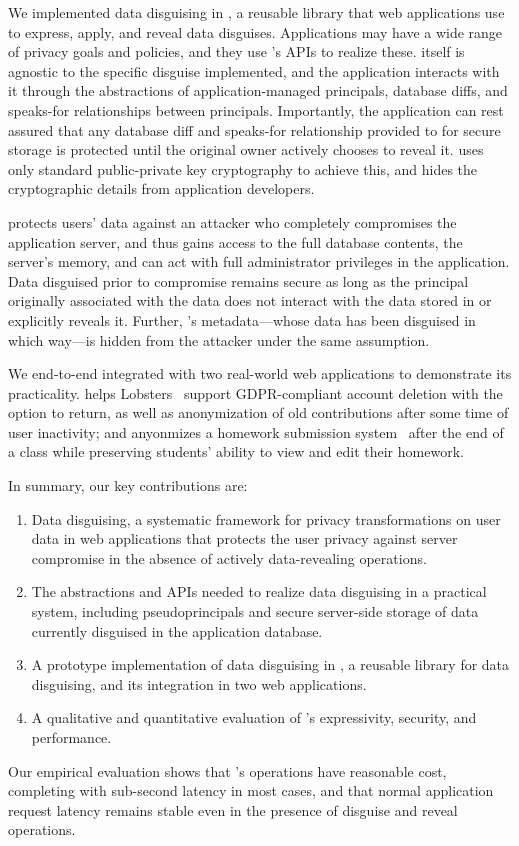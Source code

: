 %
We implemented data disguising in \sys, a reusable library that
web applications use to express, apply, and reveal data disguises.
%
Applications may have a wide range of privacy goals and policies, and they
use \sys's APIs to realize these.
%
\sys itself is agnostic to the specific disguise implemented, and the
application interacts with it through the abstractions of application-managed
principals, database diffs, and speaks-for relationships between principals.
%
Importantly, the application can rest assured that any database diff
and speaks-for relationship provided to \sys for secure storage is protected
until the original owner actively chooses to reveal it.
%
\sys uses only standard public-private key cryptography to achieve this, and
hides the cryptographic details from application developers.
%

%
%
\sys protects users' data against an attacker who completely compromises the
application server, and thus gains access to the full database contents, the server's
memory, and can act with full administrator privileges in the application.
%
Data disguised prior to compromise remains secure as long as the principal
originally associated with the data does not interact with the data stored in
\sys or explicitly reveals it.
%
Further, \sys's metadata---\eg whose data has been disguised in which way---is
hidden from the attacker under the same assumption.
%

%
%
We end-to-end integrated \sys with two real-world web applications to demonstrate
its practicality.
%
\sys helps Lobsters~\cite{lobsters} support GDPR-compliant account deletion with
the option to return, as well as anonymization of old contributions after some
time of user inactivity; and \sys anyonmizes a homework submission
system~\cite{websubmit-rs-anon} after the end of a class while preserving
students' ability to view and edit their homework.
%

%
%
In summary, our key contributions are:
%
\begin{enumerate}[nosep]
 \item Data disguising, a systematic framework for privacy transformations on
   user data in web applications that protects the user privacy against server
   compromise in the absence of actively data-revealing operations.
 \item The abstractions and APIs needed to realize data disguising in a
  practical system, including pseudoprincipals and secure server-side storage
  of data currently disguised in the application database.
 \item A prototype implementation of data disguising in \sys, a reusable
  library for data disguising, and its integration in two web applications.
 \item A qualitative and quantitative evaluation of \sys's expressivity,
  security, and performance.
\end{enumerate}
%
Our empirical evaluation shows that \sys's operations have reasonable cost,
completing with sub-second latency in most cases, and that normal application
request latency remains stable even in the presence of disguise and reveal
operations.
%

